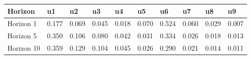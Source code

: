 \begin{tabular}{llllllllll}
\toprule
Horizon & u1 & u2 & u3 & u4 & u5 & u6 & u7 & u8 & u9 \\
\midrule
Horizon 1 & 0.177 & 0.069 & 0.045 & 0.018 & 0.070 & 0.524 & 0.060 & 0.029 & 0.007 \\
Horizon 5 & 0.350 & 0.106 & 0.080 & 0.042 & 0.031 & 0.334 & 0.026 & 0.018 & 0.013 \\
Horizon 10 & 0.359 & 0.129 & 0.104 & 0.045 & 0.026 & 0.290 & 0.021 & 0.014 & 0.011 \\
\bottomrule
\end{tabular}
